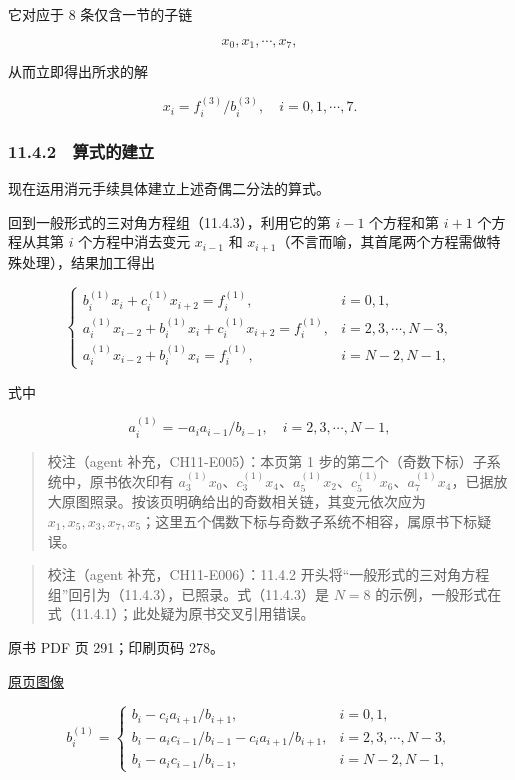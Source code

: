它对应于 8 条仅含一节的子链

\[
x_0,x_1,\cdots,x_7,
\]

从而立即得出所求的解

\[
x_i=f_i^{(3)}/b_i^{(3)},\quad i=0,1,\cdots,7.
\]

\subsubsection{11.4.2　算式的建立}\label{ch11-ux7b97ux5f0fux7684ux5efaux7acb-1}

现在运用消元手续具体建立上述奇偶二分法的算式。

回到一般形式的三对角方程组（11.4.3），利用它的第 \(i-1\) 个方程和第 \(i+1\) 个方程从其第 \(i\) 个方程中消去变元 \(x_{i-1}\) 和 \(x_{i+1}\)（不言而喻，其首尾两个方程需做特殊处理），结果加工得出

\[
\begin{cases}
b_i^{(1)}x_i+c_i^{(1)}x_{i+2}=f_i^{(1)},& i=0,1,\\
a_i^{(1)}x_{i-2}+b_i^{(1)}x_i+c_i^{(1)}x_{i+2}=f_i^{(1)},& i=2,3,\cdots,N-3,\\
a_i^{(1)}x_{i-2}+b_i^{(1)}x_i=f_i^{(1)},& i=N-2,N-1,
\end{cases}
\]

式中

\[
a_i^{(1)}=-a_i a_{i-1}/b_{i-1},\quad i=2,3,\cdots,N-1,
\]

\begin{quote}
校注（agent 补充，CH11-E005）：本页第 1 步的第二个（奇数下标）子系统中，原书依次印有 \(a_3^{(1)}x_0\)、\(c_3^{(1)}x_4\)、\(a_5^{(1)}x_2\)、\(c_5^{(1)}x_6\)、\(a_7^{(1)}x_4\)，已据放大原图照录。按该页明确给出的奇数相关链，其变元依次应为 \(x_1,x_5,x_3,x_7,x_5\)；这里五个偶数下标与奇数子系统不相容，属原书下标疑误。
\end{quote}

\begin{quote}
校注（agent 补充，CH11-E006）：11.4.2 开头将``一般形式的三对角方程组''回引为（11.4.3），已照录。式（11.4.3）是 \(N=8\) 的示例，一般形式在式（11.4.1）；此处疑为原书交叉引用错误。
\end{quote}

\clearpage

原书 PDF 页 291；印刷页码 278。

\href{source-images/pdf-291.jpeg}{原页图像}

\[
b_i^{(1)}=
\begin{cases}
b_i-c_i a_{i+1}/b_{i+1},& i=0,1,\\
b_i-a_i c_{i-1}/b_{i-1}-c_i a_{i+1}/b_{i+1},& i=2,3,\cdots,N-3,\\
b_i-a_i c_{i-1}/b_{i-1},& i=N-2,N-1,
\end{cases}
\]

